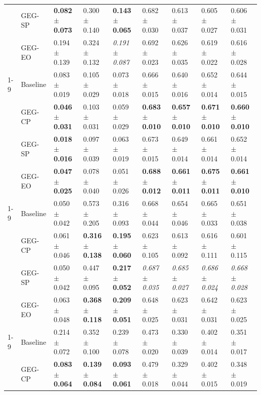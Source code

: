\begin{table}
\begin{tabular}{lllllllll}
 & GEG-SP & \textbf{0.082 $\pm$ 0.073} & 0.300 $\pm$ 0.140 & \textbf{0.143 $\pm$ 0.065} & 0.682 $\pm$ 0.030 & 0.613 $\pm$ 0.037 & 0.605 $\pm$ 0.027 & 0.606 $\pm$ 0.031 \\
 & GEG-EO & 0.194 $\pm$ 0.139 & 0.324 $\pm$ 0.132 & \textit{0.191 $\pm$ 0.087} & 0.692 $\pm$ 0.023 & 0.626 $\pm$ 0.035 & 0.619 $\pm$ 0.022 & 0.616 $\pm$ 0.028 \\
\cline{1-9}
\multirow[t]{4}{*}{law} & Baseline & 0.083 $\pm$ 0.019 & 0.105 $\pm$ 0.029 & 0.073 $\pm$ 0.018 & 0.666 $\pm$ 0.015 & 0.640 $\pm$ 0.016 & 0.652 $\pm$ 0.014 & 0.644 $\pm$ 0.015 \\
 & GEG-CP & \textbf{0.046 $\pm$ 0.031} & 0.103 $\pm$ 0.031 & 0.059 $\pm$ 0.029 & \textbf{0.683 $\pm$ 0.010} & \textbf{0.657 $\pm$ 0.010} & \textbf{0.671 $\pm$ 0.010} & \textbf{0.660 $\pm$ 0.010} \\
 & GEG-SP & \textbf{0.018 $\pm$ 0.016} & 0.097 $\pm$ 0.039 & 0.063 $\pm$ 0.019 & 0.673 $\pm$ 0.015 & 0.649 $\pm$ 0.014 & 0.661 $\pm$ 0.014 & 0.652 $\pm$ 0.014 \\
 & GEG-EO & \textbf{0.047 $\pm$ 0.025} & 0.078 $\pm$ 0.040 & 0.051 $\pm$ 0.026 & \textbf{0.688 $\pm$ 0.012} & \textbf{0.661 $\pm$ 0.011} & \textbf{0.675 $\pm$ 0.011} & \textbf{0.661 $\pm$ 0.010} \\
\cline{1-9}
\multirow[t]{4}{*}{obesity} & Baseline & 0.050 $\pm$ 0.042 & 0.573 $\pm$ 0.205 & 0.316 $\pm$ 0.093 & 0.668 $\pm$ 0.044 & 0.654 $\pm$ 0.046 & 0.665 $\pm$ 0.033 & 0.651 $\pm$ 0.038 \\
 & GEG-CP & 0.061 $\pm$ 0.046 & \textbf{0.316 $\pm$ 0.138} & \textbf{0.195 $\pm$ 0.060} & 0.623 $\pm$ 0.105 & 0.613 $\pm$ 0.092 & 0.616 $\pm$ 0.111 & 0.601 $\pm$ 0.115 \\
 & GEG-SP & 0.050 $\pm$ 0.042 & 0.447 $\pm$ 0.095 & \textbf{0.217 $\pm$ 0.052} & \textit{0.687 $\pm$ 0.035} & \textit{0.685 $\pm$ 0.027} & \textit{0.686 $\pm$ 0.024} & \textit{0.668 $\pm$ 0.028} \\
 & GEG-EO & 0.063 $\pm$ 0.048 & \textbf{0.368 $\pm$ 0.118} & \textbf{0.209 $\pm$ 0.051} & 0.648 $\pm$ 0.025 & 0.623 $\pm$ 0.031 & 0.642 $\pm$ 0.031 & 0.623 $\pm$ 0.025 \\
\cline{1-9}
\multirow[t]{4}{*}{park} & Baseline & 0.214 $\pm$ 0.072 & 0.352 $\pm$ 0.100 & 0.239 $\pm$ 0.078 & 0.473 $\pm$ 0.020 & 0.330 $\pm$ 0.039 & 0.402 $\pm$ 0.014 & 0.351 $\pm$ 0.017 \\
 & GEG-CP & \textbf{0.083 $\pm$ 0.064} & \textbf{0.139 $\pm$ 0.084} & \textbf{0.093 $\pm$ 0.061} & 0.479 $\pm$ 0.018 & 0.329 $\pm$ 0.044 & 0.402 $\pm$ 0.015 & 0.348 $\pm$ 0.019 \\

\end{tabular}
\end{table}
